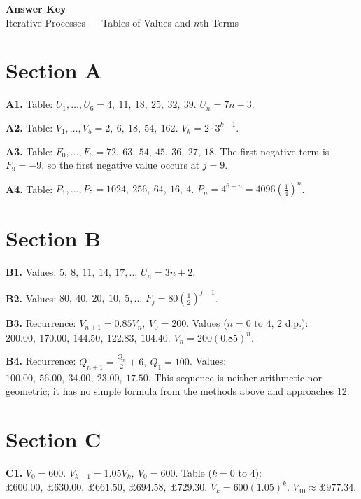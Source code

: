 \documentclass[12pt,a4paper]{article}
\begin{document}
\begin{center}
  {\LARGE\bfseries Answer Key}\\[4pt]
  {\large Iterative Processes --- Tables of Values and $n$th Terms}
\end{center}

\section*{Section A}

\textbf{A1.} Table: \(U_1,\dots,U_6 = 4,\ 11,\ 18,\ 25,\ 32,\ 39\).  
\(U_n = 7n-3\).

\medskip
\textbf{A2.} Table: \(V_1,\dots,V_5 = 2,\ 6,\ 18,\ 54,\ 162\).  
\(V_k = 2\cdot 3^{k-1}\).

\medskip
\textbf{A3.} Table: \(F_0,\dots,F_6 = 72,\ 63,\ 54,\ 45,\ 36,\ 27,\ 18\).  
The first negative term is \(F_9 = -9\), so the first negative value occurs at \(j=9\).

\medskip
\textbf{A4.} Table: \(P_1,\dots,P_5 = 1024,\ 256,\ 64,\ 16,\ 4\).  
\(P_n = 4^{6-n} = 4096\left(\frac{1}{4}\right)^{\!n}\).

\section*{Section B}

\textbf{B1.} Values: \(5,\ 8,\ 11,\ 14,\ 17,\ldots\)  
\(U_n = 3n+2\).

\medskip
\textbf{B2.} Values: \(80,\ 40,\ 20,\ 10,\ 5,\ldots\)  
\(F_j = 80\left(\frac{1}{2}\right)^{\!j-1}\).

\medskip
\textbf{B3.} Recurrence: \(V_{n+1}=0.85V_n,\ V_0=200\).  
Values ($n=0$ to $4$, 2 d.p.): \(200.00,\ 170.00,\ 144.50,\ 122.83,\ 104.40\).  
\(V_n = 200(0.85)^n\).

\medskip
\textbf{B4.} Recurrence: \(Q_{n+1}=\frac{Q_n}{2}+6,\ Q_1=100\).  
Values: \(100.00,\ 56.00,\ 34.00,\ 23.00,\ 17.50\).  
This sequence is neither arithmetic nor geometric; it has no simple formula from the methods above and approaches 12.

\section*{Section C}

\textbf{C1.} \(V_0=600\).  
\(V_{k+1}=1.05V_k,\ V_0=600\).  
Table ($k=0$ to $4$): \(\pounds600.00,\ \pounds630.00,\ \pounds661.50,\ \pounds694.58,\ \pounds729.30\).  
\(V_k = 600(1.05)^k\).  
\(V_{10} \approx \pounds977.34\).
\end{document}
